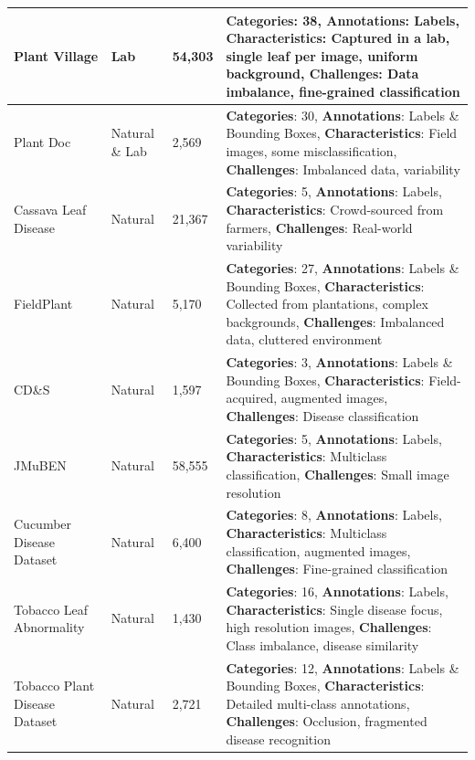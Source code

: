 \documentclass[sn-mathphys]{sn-jnl}
\theoremstyle{thmstyleone}%
\theoremstyle{thmstyletwo}%
\theoremstyle{thmstylethree}%
\begin{document}
\begin{footnotesize}
\begin{longtable}{@{}p{3cm}p{2cm}p{2cm}p{5cm}@{}}
  Plant Village \citep{mohanty2016using} & Lab & 54,303 & \textbf{Categories}: 38, \textbf{Annotations}: Labels, \textbf{Characteristics}: Captured in a lab, single leaf per image, uniform background, \textbf{Challenges}: Data imbalance, fine-grained classification \\
  \midrule
  Plant Doc \citep{mohanty2016using} & Natural \& Lab & 2,569 & \textbf{Categories}: 30, \textbf{Annotations}: Labels \& Bounding Boxes, \textbf{Characteristics}: Field images, some misclassification, \textbf{Challenges}: Imbalanced data, variability \\
  \midrule
  Cassava Leaf Disease \citep{Cassava_Competition} & Natural & 21,367 & \textbf{Categories}: 5, \textbf{Annotations}: Labels, \textbf{Characteristics}: Crowd-sourced from farmers, \textbf{Challenges}: Real-world variability \\
  \midrule
  FieldPlant \citep{moupojou2023fieldplant} & Natural & 5,170 & \textbf{Categories}: 27, \textbf{Annotations}: Labels \& Bounding Boxes, \textbf{Characteristics}: Collected from plantations, complex backgrounds, \textbf{Challenges}: Imbalanced data, cluttered environment \\
  \midrule
  CD\&S \citep{CDS} & Natural & 1,597 & \textbf{Categories}: 3, \textbf{Annotations}: Labels \& Bounding Boxes, \textbf{Characteristics}: Field-acquired, augmented images, \textbf{Challenges}: Disease classification \\
  \midrule  
  JMuBEN \citep{jepkoech2021jmuben2} & Natural & 58,555 & \textbf{Categories}: 5, \textbf{Annotations}: Labels, \textbf{Characteristics}: Multiclass classification, \textbf{Challenges}: Small image resolution \\
  \midrule
  Cucumber Disease Dataset \citep{sultana2023dataset} & Natural & 6,400 & \textbf{Categories}: 8, \textbf{Annotations}: Labels, \textbf{Characteristics}: Multiclass classification, augmented images, \textbf{Challenges}: Fine-grained classification \\
  \midrule
  Tobacco Leaf Abnormality \citep{lin2024few} & Natural & 1,430 & \textbf{Categories}: 16, \textbf{Annotations}: Labels, \textbf{Characteristics}: Single disease focus, high resolution images, \textbf{Challenges}: Class imbalance, disease similarity \\
  \midrule
  Tobacco Plant Disease Dataset \citep{tpdd} & Natural & 2,721 & \textbf{Categories}: 12, \textbf{Annotations}: Labels \& Bounding Boxes, \textbf{Characteristics}: Detailed multi-class annotations, \textbf{Challenges}: Occlusion, fragmented disease recognition \\

\end{longtable}
\end{footnotesize}
\end{document}
